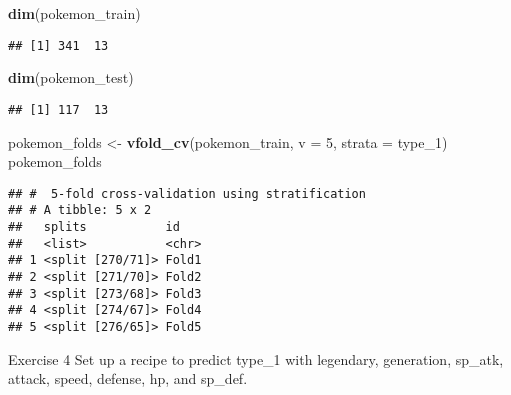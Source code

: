 \documentclass[]{article}
\newenvironment{Shaded}{\begin{snugshade}}{\end{snugshade}}
\newcommand{\DataTypeTok}[1]{\textcolor[rgb]{0.13,0.29,0.53}{#1}}
\newcommand{\DecValTok}[1]{\textcolor[rgb]{0.00,0.00,0.81}{#1}}
\newcommand{\KeywordTok}[1]{\textcolor[rgb]{0.13,0.29,0.53}{\textbf{#1}}}
\newcommand{\NormalTok}[1]{#1}
\newcommand{\OperatorTok}[1]{\textcolor[rgb]{0.81,0.36,0.00}{\textbf{#1}}}
\newcommand{\StringTok}[1]{\textcolor[rgb]{0.31,0.60,0.02}{#1}}
\begin{document}
\begin{Shaded}
\begin{Highlighting}[]
\KeywordTok{dim}\NormalTok{(pokemon_train)}
\end{Highlighting}
\end{Shaded}

\begin{verbatim}
## [1] 341  13
\end{verbatim}

\begin{Shaded}
\begin{Highlighting}[]
\KeywordTok{dim}\NormalTok{(pokemon_test)}
\end{Highlighting}
\end{Shaded}

\begin{verbatim}
## [1] 117  13
\end{verbatim}

\begin{Shaded}
\begin{Highlighting}[]
\NormalTok{pokemon_folds <-}\StringTok{ }\KeywordTok{vfold_cv}\NormalTok{(pokemon_train, }\DataTypeTok{v =} \DecValTok{5}\NormalTok{, }\DataTypeTok{strata =}\NormalTok{ type_}\DecValTok{1}\NormalTok{)}
\NormalTok{pokemon_folds}
\end{Highlighting}
\end{Shaded}

\begin{verbatim}
## #  5-fold cross-validation using stratification 
## # A tibble: 5 x 2
##   splits           id   
##   <list>           <chr>
## 1 <split [270/71]> Fold1
## 2 <split [271/70]> Fold2
## 3 <split [273/68]> Fold3
## 4 <split [274/67]> Fold4
## 5 <split [276/65]> Fold5
\end{verbatim}

Exercise 4 Set up a recipe to predict type\_1 with legendary,
generation, sp\_atk, attack, speed, defense, hp, and sp\_def.

\begin{Shaded}
\end{Shaded}
\end{document}
